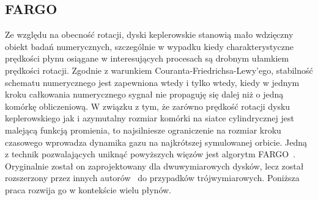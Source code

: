 \subsection{FARGO}
Ze względu na obecność rotacji, dyski keplerowskie stanowią mało wdzięczny
obiekt badań numerycznych, szczególnie w wypadku kiedy charakterystyczne
prędkości płynu osiągane w interesujących procesach są drobnym ułamkiem
prędkości rotacji. Zgodnie z warunkiem Couranta-Friedrichsa-Lewy'ego, stabilność
schematu numerycznego jest zapewniona wtedy i tylko wtedy, kiedy w jednym kroku
całkowania numerycznego sygnał nie propaguję się dalej niż o jedną komórkę
obliczeniową. W związku z tym, że zarówno prędkość rotacji dysku keplerowskiego
jak i azymutalny rozmiar komórki na siatce cylindrycznej jest malejącą funkcją
promienia, to najsilniesze ograniczenie na rozmiar kroku czasowego wprowadza
dynamika gazu na najkrótszej symulowanej orbicie. Jedną z technik pozwalających
uniknąć powyższych więzów jest algorytm FARGO~\citep{Masset00}. Oryginalnie
został on zaprojektowany dla dwuwymiarowych dysków, lecz został rozszerzony
przez innych autorów~\cite{fargo2} do przypadków trójwymiarowych. Poniższa praca
rozwija go w kontekście wielu płynów.

